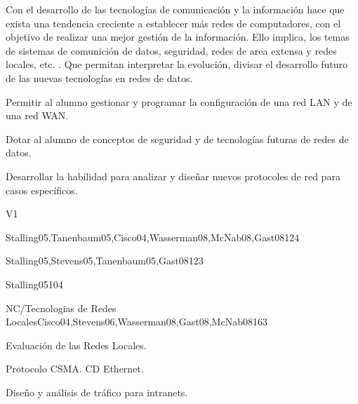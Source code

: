 \begin{syllabus}


\begin{justification}
Con el desarrollo de las tecnologías de comunicación   y la información
 hace que exista una tendencia creciente a  establecer  más redes de
 computadores,  con el objetivo de realizar una mejor gestión de la
 información.  Ello implica, los temas de sistemas de comunición de  datos,
  seguridad, redes de area extensa  y redes  locales, etc.  . Que permitan
  interpretar la  evolución, divisar  el desarrollo  futuro de las
  nuevas  tecnologías en redes de datos.
\end{justification}

\begin{goals}
\item Permitir al alumno gestionar y programar la configuración de una red LAN y de una red WAN.
\item Dotar al alumno de conceptos de seguridad y de tecnologías futuras de redes de datos.
\item Desarrollar la habilidad para analizar y diseñar nuevos protocoles de red para casos específicos.
\end{goals}

\begin{outcomes}{V1}
\end{outcomes}

\begin{unit}{\NCIntroductionDef}{}{Stalling05,Tanenbaum05,Cisco04,Wasserman08,McNab08,Gast08}{12}{4}
   \NCIntroductionAllTopics
   \NCIntroductionAllObjectives
\end{unit}

\begin{unit}{\NCNetworkCommunicationDef}{}{Stalling05,Stevens05,Tanenbaum05,Gast08}{12}{3}
   \NCNetworkCommunicationAllTopics
   \NCNetworkCommunicationAllObjectives
\end{unit}

\begin{unit}{\NCCompressionDef}{}{Stalling05}{10}{4}
	\NCCompressionAllTopics
	\NCCompressionAllObjectives
\end{unit}

\begin{unit}{NC/Tecnologias de Redes Locales}{}{Cisco04,Stevens06,Wasserman08,Gast08,McNab08}{16}{3}
   \begin{topics}
      \item Evaluación de las  Redes  Locales.
      \item Protocolo CSMA. CD Ethernet.
      \item Diseño y  análisis de  tráfico para intranets.
   \end{topics}


\end{unit}
\end{syllabus}
